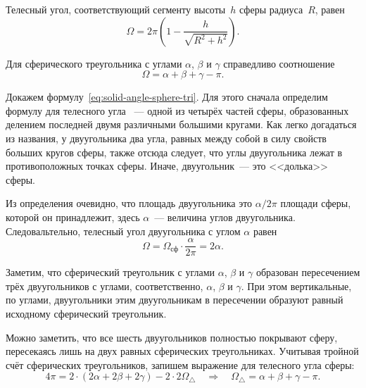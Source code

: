 Телесный угол, соответствующий сегменту высоты~$h$ сферы радиуса~$R$, равен
\begin{equation}
    \Omega = 2 \pi \left(1 - \dfrac{h}{\sqrt{R^2 + h^2}}\right).
\end{equation}

Для сферического треугольника с углами $\alpha$, $\beta$ и $\gamma$ справедливо соотношение
\begin{equation}
    \Omega = \alpha + \beta + \gamma - \pi. \label{eq:solid-angle-sphere-tri}
\end{equation}

Докажем формулу~\eqref{eq:solid-angle-sphere-tri}. Для этого сначала определим формулу для телесного угла ~--- одной из четырёх частей сферы, образованных делением последней двумя различными большими кругами. Как легко догадаться из названия, у двуугольника два угла, равных между собой в силу свойств больших кругов сферы, также отсюда следует, что углы двуугольника лежат в противоположных точках сферы. Иначе, двуугольник~--- это <<долька>> сферы. 

Из определения очевидно, что площадь двуугольника это $\alpha/ 2\pi$ площади сферы, которой он принадлежит, здесь $\alpha$~--- величина углов двуугольника. Следовальтельно, телесный угол двуугольника с углом $\alpha$ равен \begin{equation*}
     \Omega = \Omega_\text{сф} \cdot \frac{\alpha}{2 \pi} = 2 \alpha.
 \end{equation*}
 
 Заметим, что сферический треугольник с углами $\alpha$, $\beta$ и $\gamma$ образован пересечением трёх двуугольников с углами, соответственно, $\alpha$, $\beta$ и $\gamma$. При этом вертикальные, по углами, двуугольники этим двуугольникам в пересечении образуют равный исходному сферический треугольник. 
 
 Можно заметить, что все шесть двуугольников полностью покрывают сферу, пересекаясь лишь на двух равных сферических треугольниках. Учитывая тройной счёт сферических треугольников, запишем выражение для телесного угла сферы:
 \begin{equation*}
     4\pi = 2 \cdot (2 \alpha +2 \beta + 2 \gamma) - 2 \cdot 2 \Omega_\triangle \quad \Rightarrow \quad \Omega_\triangle = \alpha + \beta + \gamma - \pi.
 \end{equation*}













